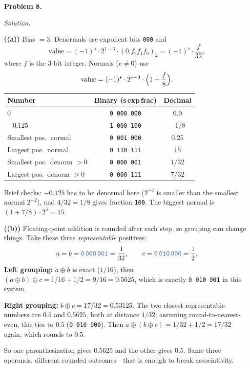 \documentclass[12pt]{article}
\newcommand{\problem}[1]{\vspace{0.8em}\noindent\textbf{Problem #1.}\vspace{0.35em}}
\newenvironment{solution}{\par\noindent\textit{Solution.}\ }{\par\vspace{1.1em}}
\newcommand{\subproblem}[1]{\par\vspace{0.45em}\noindent\textbf{(#1)}\quad}
\newcommand{\bits}[1]{\texttt{\textcolor{NavyBlue}{#1}}}
\begin{document}
\problem{8}
\begin{solution}
\subproblem{(a)}
Bias $=3$. Denormals use exponent bits \texttt{000} and
\[
\text{value}=(-1)^s\cdot 2^{1-3}\cdot (0.f_2f_1f_0)_2 = (-1)^s\cdot \frac{f}{32},
\]
where $f$ is the 3-bit integer. Normals ($e\neq 0$) use
\[
\text{value}=(-1)^s\cdot 2^{e-3}\cdot\Bigl(1+\frac{f}{8}\Bigr).
\]

\begin{center}
\begin{tabular}{@{}lcc@{}}
\toprule
Number & Binary (s\,exp\,frac) & Decimal \\
\midrule
$0$ & \bits{0\,000\,000} & $0.0$ \\
$-0.125$ & \bits{1\,000\,100} & $-1/8$ \\
Smallest pos.\ normal & \bits{0\,001\,000} & $0.25$ \\
Largest pos.\ normal & \bits{0\,110\,111} & $15$ \\
Smallest pos.\ denorm $>0$ & \bits{0\,000\,001} & $1/32$ \\
Largest pos.\ denorm $>0$ & \bits{0\,000\,111} & $7/32$ \\
\bottomrule
\end{tabular}
\end{center}

Brief checks: $-0.125$ has to be denormal here ($2^{-3}$ is smaller than the smallest normal $2^{-2}$), and $4/32=1/8$ gives fraction \bits{100}. The biggest normal is $(1+7/8)\cdot 2^{3}=15$.

\subproblem{(b)}
Floating-point addition is rounded after each step, so grouping can change things. Take these three \emph{representable} positives:
\[
a=b=\bits{0\,000\,001}=\frac{1}{32},\qquad
c=\bits{0\,010\,000}=\frac12.
\]
\textbf{Left grouping:} $a\oplus b$ is exact ($1/16$), then $(a\oplus b)\oplus c = 1/16+1/2 = 9/16 = 0.5625$, which is exactly \bits{0\,010\,001} in this system.

\textbf{Right grouping:} $b\oplus c = 17/32 = 0.53125$. The two closest representable numbers are $0.5$ and $0.5625$, both at distance $1/32$; assuming round-to-nearest-even, this ties to $0.5$ (\bits{0\,010\,000}). Then $a\oplus (b\oplus c)=1/32+1/2=17/32$ again, which rounds to $0.5$.

So one parenthesization gives $0.5625$ and the other gives $0.5$. Same three operands, different rounded outcomes---that is enough to break associativity.
\end{solution}
\end{document}
